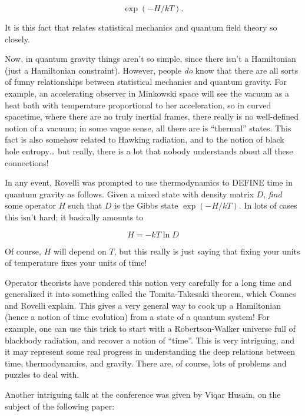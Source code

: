 \documentclass{article}
\def\tightlist{}
\renewcommand{\texttt}[1]{%
  \begingroup
  \ttfamily
  \begingroup\lccode`~=`/\lowercase{\endgroup\def~}{/\discretionary{}{}{}}%
  \begingroup\lccode`~=`[\lowercase{\endgroup\def~}{[\discretionary{}{}{}}%
  \begingroup\lccode`~=`.\lowercase{\endgroup\def~}{.\discretionary{}{}{}}%
  \catcode`/=\active\catcode`[=\active\catcode`.=\active
  \scantokens{#1\noexpand}%
  \endgroup
}
\begin{document}
\[\exp(-H/kT).\]

It is this fact that relates statistical mechanics and quantum field
theory so closely.

Now, in quantum gravity things aren't so simple, since there isn't a
Hamiltonian (just a Hamiltonian constraint). However, people \emph{do}
know that there are all sorts of funny relationships between statistical
mechanics and quantum gravity. For example, an accelerating observer in
Minkowski space will see the vacuum as a heat bath with temperature
proportional to her acceleration, so in curved spacetime, where there
are no truly inertial frames, there really is no well-defined notion of
a vacuum; in some vague sense, all there are is ``thermal'' states. This
fact is also somehow related to Hawking radiation, and to the notion of
black hole entropy\ldots{} but really, there is a lot that nobody
understands about all these connections!

In any event, Rovelli was prompted to use thermodynamics to DEFINE time
in quantum gravity as follows. Given a mixed state with density matrix
\(D\), \emph{find} some operator \(H\) such that \(D\) is the Gibbs
state \(\exp(-H/kT)\). In lots of cases this isn't hard; it basically
amounts to

\[H = -kT \ln D\]

Of course, \(H\) will depend on \(T\), but this really is just saying
that fixing your units of temperature fixes your units of time!

Operator theorists have pondered this notion very carefully for a long
time and generalized it into something called the Tomita-Takesaki
theorem, which Connes and Rovelli explain. This gives a very general way
to cook up a Hamiltonian (hence a notion of time evolution) from a state
of a quantum system! For example, one can use this trick to start with a
Robertson-Walker universe full of blackbody radiation, and recover a
notion of ``time''. This is very intriguing, and it may represent some
real progress in understanding the deep relations between time,
thermodynamics, and gravity. There are, of course, lots of problems and
puzzles to deal with.

Another intriguing talk at the conference was given by Viqar Husain, on
the subject of the following paper:

\end{document}
